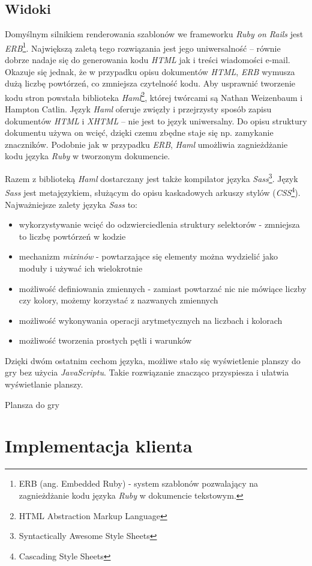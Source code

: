 \documentclass[a4paper,12pt]{article}
\begin{document}
\subsection{Widoki}
Domyślnym silnikiem renderowania szablonów we frameworku \emph{Ruby on
  Rails} jest \emph{ERB}\footnote{ERB (ang. Embedded Ruby) - system
  szablonów pozwalający na zagnieżdżanie kodu języka \emph{Ruby} w
  dokumencie tekstowym.}. Największą zaletą tego rozwiązania jest jego
uniwersalność -- równie dobrze nadaje się do generowania kodu
\emph{HTML} jak i treści wiadomości e-mail. Okazuje się jednak, że w
przypadku opisu dokumentów \emph{HTML}, \emph{ERB} wymusza dużą liczbę
powtórzeń, co zmniejsza czytelność kodu. Aby usprawnić tworzenie kodu
stron powstała biblioteka \emph{Haml}\footnote{HTML Abstraction Markup
  Language}, której twórcami są Nathan Weizenbaum i Hampton
Catlin. Język \emph{Haml} oferuje zwięzły i przejrzysty sposób zapisu
dokumentów \emph{HTML} i \emph{XHTML} -- nie jest to język
uniwersalny. Do opisu struktury dokumentu używa on wcięć, dzięki czemu
zbędne staje się np. zamykanie znaczników. Podobnie jak w przypadku
\emph{ERB}, \emph{Haml} umożliwia zagnieżdżanie kodu języka
\emph{Ruby} w tworzonym dokumencie.

Razem z biblioteką \emph{Haml} dostarczany jest także kompilator
języka \emph{Sass}\footnote{Syntactically Awesome Style Sheets}. Język
\emph{Sass} jest metajęzykiem, służącym do opisu kaskadowych arkuszy
stylów (\emph{CSS}\footnote{Cascading Style Sheets}). Najważniejsze
zalety języka \emph{Sass} to:

\begin{itemize}
\item wykorzystywanie wcięć do odzwierciedlenia struktury selektorów -
  zmniejsza to liczbę powtórzeń w kodzie
\item mechanizm \emph{mixinów} - powtarzające się elementy można
  wydzielić jako moduły i używać ich wielokrotnie
\item możliwość definiowania zmiennych - zamiast powtarzać nic nie
  mówiące liczby czy kolory, możemy korzystać z nazwanych
  zmiennych
\item możliwość wykonywania operacji arytmetycznych na liczbach i
  kolorach
\item możliwość tworzenia prostych pętli i warunków
\end{itemize}

Dzięki dwóm ostatnim cechom języka, możliwe stało się wyświetlenie
planszy do gry bez użycia \emph{JavaScriptu}. Takie rozwiązanie
znacząco przyspiesza i ułatwia wyświetlanie planszy.

\begin{listing}
  
  \caption{Plansza do gry}
  \label{listing:boardtable}
\end{listing}

\clearpage

\section{Implementacja klienta}

\clearpage



\end{document}
